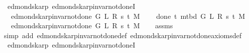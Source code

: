 \begin{isabellebody}
\isanewline
{}\isamarkupfalse%
\ {\isacharparenleft}{\kern0pt}\ edmonds{\isacharunderscore}{\kern0pt}karp{\isacharparenright}{\kern0pt}\ edmonds{\isacharunderscore}{\kern0pt}karp{\isacharunderscore}{\kern0pt}invar{\isacharunderscore}{\kern0pt}not{\isacharunderscore}{\kern0pt}done{\isacharunderscore}{\kern0pt}{}I{\isacharcolon}{\kern0pt}\isanewline
\ \ \ {\isachardoublequoteopen}edmonds{\isacharunderscore}{\kern0pt}karp{\isacharunderscore}{\kern0pt}invar{\isacharunderscore}{\kern0pt}not{\isacharunderscore}{\kern0pt}done{\isacharunderscore}{\kern0pt}{}{\isacharprime}{\kern0pt}\ G\ L\ R\ s\ t\ M{\isachardoublequoteclose}\isanewline
\ \ \ {\isachardoublequoteopen}{\isasymnot}\ done{\isacharunderscore}{\kern0pt}{}\ t\ {\isacharparenleft}{\kern0pt}m{\isacharunderscore}{\kern0pt}tbd\ G\ L\ R\ s\ t\ M{\isacharparenright}{\kern0pt}{\isachardoublequoteclose}\isanewline
\ \ \ {\isachardoublequoteopen}edmonds{\isacharunderscore}{\kern0pt}karp{\isacharunderscore}{\kern0pt}invar{\isacharunderscore}{\kern0pt}not{\isacharunderscore}{\kern0pt}done{\isacharunderscore}{\kern0pt}{}{\isacharprime}{\kern0pt}\ G\ L\ R\ s\ t\ M{\isachardoublequoteclose}%
\endisataginvisible
{\isafoldinvisible}%
%
\isadeliminvisible
\isanewline
%
\endisadeliminvisible
%
\isadelimproof
\ \ %
\endisadelimproof
%
\isatagproof
{}\isamarkupfalse%
\ assms\isanewline
\ \ \isamarkupfalse%
\ {\isacharparenleft}{\kern0pt}simp\ add{\isacharcolon}{\kern0pt}\ edmonds{\isacharunderscore}{\kern0pt}karp{\isacharunderscore}{\kern0pt}invar{\isacharunderscore}{\kern0pt}not{\isacharunderscore}{\kern0pt}done{\isacharunderscore}{\kern0pt}{}{\isacharunderscore}{\kern0pt}def\ edmonds{\isacharunderscore}{\kern0pt}karp{\isacharunderscore}{\kern0pt}invar{\isacharunderscore}{\kern0pt}not{\isacharunderscore}{\kern0pt}done{\isacharunderscore}{\kern0pt}{}{\isacharunderscore}{\kern0pt}axioms{\isacharunderscore}{\kern0pt}def{\isacharparenright}{\kern0pt}%
\endisatagproof
{\isafoldproof}%
%
\isadelimproof
\isanewline
%
\endisadelimproof
%
\isadeliminvisible
\isanewline
%
\endisadeliminvisible
%
\isataginvisible
{}\isamarkupfalse%
\ {\isacharparenleft}{\kern0pt}\ edmonds{\isacharunderscore}{\kern0pt}karp{\isacharparenright}{\kern0pt}\ edmonds{\isacharunderscore}{\kern0pt}karp{\isacharunderscore}{\kern0pt}invar{\isacharunderscore}{\kern0pt}not{\isacharunderscore}{\kern0pt}done{\isacharunderscore}{\kern0pt}{}I{\isacharunderscore}{\kern0pt}{}{\isacharcolon}{\kern0pt}\isanewline

\end{isabellebody}
